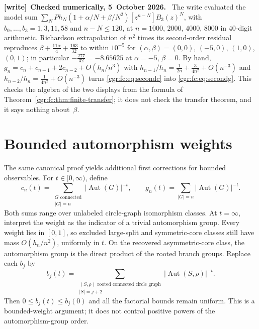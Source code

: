 \documentclass[11pt,letterpaper]{article}
\numberwithin{equation}{section}
\theoremstyle{definition}\newtheorem{definition}[theorem]{Definition}
\theoremstyle{remark}\newtheorem{remark}[theorem]{Remark}
\DeclareMathOperator{\Aut}{Aut}
\newenvironment{writenote}[1][]{\par\smallskip\begingroup\small
 \noindent\textbf{[write]}\if\relax\detokenize{#1}\relax\else~\textbf{#1.}\fi\ }%
 {\par\endgroup\smallskip}
\begin{document}
\begin{writenote}[Checked numerically, 5~October 2026]
The write evaluated the model sum $\sum_NPh_N(1+\alpha/N+\beta/N^2)[z^{n-N}]B_3(z)^N$, with $b_0,\ldots,b_3=1,3,11,58$ and $n-N\le120$, at $n=1000$, $2000$, $4000$, $8000$ in 40-digit arithmetic. Richardson extrapolation of $n^2$ times its second-order residual reproduces $\beta+\frac{11\alpha}4+\frac{163}{32}$ to within $10^{-5}$ for $(\alpha,\beta)=(0,0)$, $(-5,0)$, $(1,0)$, $(0,1)$; in particular $-\frac{277}{32}=-8.65625$ at $\alpha=-5$, $\beta=0$. By hand, $g_n=c_n+c_{n-1}+2c_{n-2}+O(h_n/n^3)$ with $h_{n-1}/h_n=\frac1{2n}+\frac3{4n^2}+O(n^{-3})$ and $h_{n-2}/h_n=\frac1{4n^2}+O(n^{-3})$ turns \eqref{cgr:fc:eq:secondc} into \eqref{cgr:fc:eq:secondg}. This checks the algebra of the two displays from the formula of Theorem~\ref{cgr:fc:thm:finite-transfer}; it does not check the transfer theorem, and it says nothing about~$\beta$.
\end{writenote}

\section{Bounded automorphism weights}\label{cgr:fc:sec:weighted}
The same canonical proof yields additional first corrections for
bounded observables. For $t\in[0,\infty)$, define
\[
 c_n(t)=\sum_{\substack{G\text{ connected}\\|G|=n}}|\Aut(G)|^{-t},
 \qquad g_n(t)=\sum_{|G|=n}|\Aut(G)|^{-t}.
\]
Both sums range over unlabeled circle-graph isomorphism classes.
At $t=\infty$, interpret the weight as the indicator of a trivial
automorphism group. Every weight lies in $[0,1]$, so excluded
large-split and symmetric-core classes still have mass
$O(h_n/n^2)$, uniformly in $t$. On the recovered asymmetric-core
class, the automorphism group is the direct product of the rooted
branch groups. Replace each $b_j$ by
\[
 b_j(t)=\sum_{\substack{(S,\rho)\text{ rooted connected circle graph}\\
                       |S|=j+2}}|\Aut(S,\rho)|^{-t}.
\]
Then $0\le b_j(t)\le b_j(0)$ and all the factorial bounds remain
uniform. This is a bounded-weight argument; it does not control
positive powers of the automorphism-group order.
\end{document}
